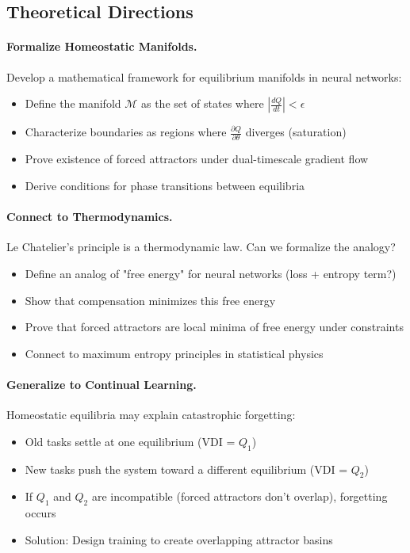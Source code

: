 \subsection{Theoretical Directions}

\paragraph{Formalize Homeostatic Manifolds.}
Develop a mathematical framework for equilibrium manifolds in neural networks:
\begin{itemize}
\item Define the manifold $\mathcal{M}$ as the set of states where $|\frac{dQ}{dt}| < \epsilon$
\item Characterize boundaries as regions where $\frac{\partial Q}{\partial \theta}$ diverges (saturation)
\item Prove existence of forced attractors under dual-timescale gradient flow
\item Derive conditions for phase transitions between equilibria
\end{itemize}

\paragraph{Connect to Thermodynamics.}
Le Chatelier's principle is a thermodynamic law. Can we formalize the analogy?
\begin{itemize}
\item Define an analog of "free energy" for neural networks (loss + entropy term?)
\item Show that compensation minimizes this free energy
\item Prove that forced attractors are local minima of free energy under constraints
\item Connect to maximum entropy principles in statistical physics
\end{itemize}

\paragraph{Generalize to Continual Learning.}
Homeostatic equilibria may explain catastrophic forgetting:
\begin{itemize}
\item Old tasks settle at one equilibrium (VDI = $Q_1$)
\item New tasks push the system toward a different equilibrium (VDI = $Q_2$)
\item If $Q_1$ and $Q_2$ are incompatible (forced attractors don't overlap), forgetting occurs
\item Solution: Design training to create overlapping attractor basins
\end{itemize}
